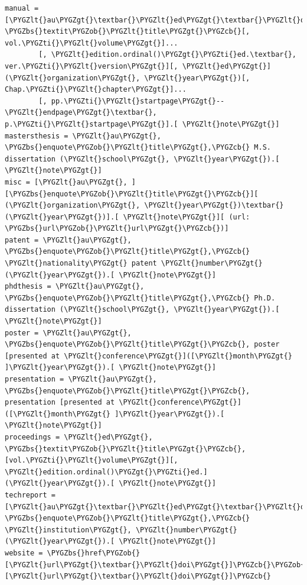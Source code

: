 \documentclass[letterpaper,10pt,english]{sphinxmanual}
\def\PYGZbs{\char`\\}
\def\PYGZob{\char`\{}
\def\PYGZcb{\char`\}}
\def\PYGZlt{\char`\<}
\def\PYGZgt{\char`\>}
\def\PYGZti{\char`\~}
\begin{document}
\begin{Verbatim}[commandchars=\\\{\}]
manual = [\PYGZlt{}au\PYGZgt{}\textbar{}\PYGZlt{}ed\PYGZgt{}\textbar{}\PYGZlt{}organization\PYGZgt{}\textbar{}\PYGZlt{}institution\PYGZgt{}\textbar{}], \PYGZbs{}textit\PYGZob{}\PYGZlt{}title\PYGZgt{}\PYGZcb{}[, vol.\PYGZti{}\PYGZlt{}volume\PYGZgt{}]...
        [, \PYGZlt{}edition.ordinal()\PYGZgt{}\PYGZti{}ed.\textbar{}, ver.\PYGZti{}\PYGZlt{}version\PYGZgt{}][, \PYGZlt{}ed\PYGZgt{}] (\PYGZlt{}organization\PYGZgt{}, \PYGZlt{}year\PYGZgt{})[, Chap.\PYGZti{}\PYGZlt{}chapter\PYGZgt{}]...
        [, pp.\PYGZti{}\PYGZlt{}startpage\PYGZgt{}--\PYGZlt{}endpage\PYGZgt{}\textbar{}, p.\PYGZti{}\PYGZlt{}startpage\PYGZgt{}].[ \PYGZlt{}note\PYGZgt{}]
mastersthesis = \PYGZlt{}au\PYGZgt{}, \PYGZbs{}enquote\PYGZob{}\PYGZlt{}title\PYGZgt{},\PYGZcb{} M.S. dissertation (\PYGZlt{}school\PYGZgt{}, \PYGZlt{}year\PYGZgt{}).[ \PYGZlt{}note\PYGZgt{}]
misc = [\PYGZlt{}au\PYGZgt{}, ][\PYGZbs{}enquote\PYGZob{}\PYGZlt{}title\PYGZgt{}\PYGZcb{}][ (\PYGZlt{}organization\PYGZgt{}, \PYGZlt{}year\PYGZgt{})\textbar{} (\PYGZlt{}year\PYGZgt{})].[ \PYGZlt{}note\PYGZgt{}][ (url: \PYGZbs{}url\PYGZob{}\PYGZlt{}url\PYGZgt{}\PYGZcb{})]
patent = \PYGZlt{}au\PYGZgt{}, \PYGZbs{}enquote\PYGZob{}\PYGZlt{}title\PYGZgt{},\PYGZcb{} \PYGZlt{}nationality\PYGZgt{} patent \PYGZlt{}number\PYGZgt{} (\PYGZlt{}year\PYGZgt{}).[ \PYGZlt{}note\PYGZgt{}]
phdthesis = \PYGZlt{}au\PYGZgt{}, \PYGZbs{}enquote\PYGZob{}\PYGZlt{}title\PYGZgt{},\PYGZcb{} Ph.D. dissertation (\PYGZlt{}school\PYGZgt{}, \PYGZlt{}year\PYGZgt{}).[ \PYGZlt{}note\PYGZgt{}]
poster = \PYGZlt{}au\PYGZgt{}, \PYGZbs{}enquote\PYGZob{}\PYGZlt{}title\PYGZgt{}\PYGZcb{}, poster [presented at \PYGZlt{}conference\PYGZgt{}]([\PYGZlt{}month\PYGZgt{} ]\PYGZlt{}year\PYGZgt{}).[ \PYGZlt{}note\PYGZgt{}]
presentation = \PYGZlt{}au\PYGZgt{}, \PYGZbs{}enquote\PYGZob{}\PYGZlt{}title\PYGZgt{}\PYGZcb{}, presentation [presented at \PYGZlt{}conference\PYGZgt{}]([\PYGZlt{}month\PYGZgt{} ]\PYGZlt{}year\PYGZgt{}).[ \PYGZlt{}note\PYGZgt{}]
proceedings = \PYGZlt{}ed\PYGZgt{}, \PYGZbs{}textit\PYGZob{}\PYGZlt{}title\PYGZgt{}\PYGZcb{}, [vol.\PYGZti{}\PYGZlt{}volume\PYGZgt{}][, \PYGZlt{}edition.ordinal()\PYGZgt{}\PYGZti{}ed.] (\PYGZlt{}year\PYGZgt{}).[ \PYGZlt{}note\PYGZgt{}]
techreport = [\PYGZlt{}au\PYGZgt{}\textbar{}\PYGZlt{}ed\PYGZgt{}\textbar{}\PYGZlt{}organization\PYGZgt{}\textbar{}\PYGZlt{}institution\PYGZgt{}\textbar{}], \PYGZbs{}enquote\PYGZob{}\PYGZlt{}title\PYGZgt{},\PYGZcb{} \PYGZlt{}institution\PYGZgt{}, \PYGZlt{}number\PYGZgt{} (\PYGZlt{}year\PYGZgt{}).[ \PYGZlt{}note\PYGZgt{}]
website = \PYGZbs{}href\PYGZob{}[\PYGZlt{}url\PYGZgt{}\textbar{}\PYGZlt{}doi\PYGZgt{}]\PYGZcb{}\PYGZob{}[\PYGZlt{}url\PYGZgt{}\textbar{}\PYGZlt{}doi\PYGZgt{}]\PYGZcb{}


\end{Verbatim}
\end{document}
